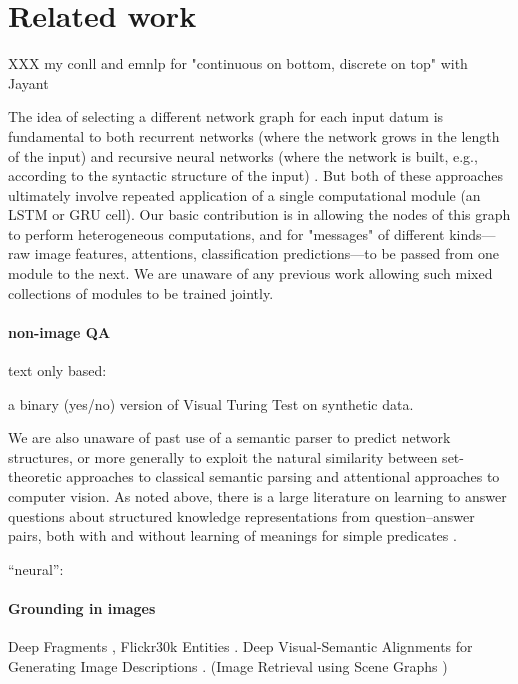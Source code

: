 \section{Related work}

XXX my conll and emnlp for "continuous on bottom, discrete on top" with Jayant

The idea of selecting a different network graph for each input datum is fundamental to both recurrent networks (where the network grows in the length of the input) \cite{Elman90RNN} and recursive neural networks (where the network is built, e.g., according to the syntactic structure of the input) \cite{Socher13CVG}. But both of these approaches ultimately involve repeated application of a single computational module (\eg an LSTM \cite{} or GRU \cite{} cell). Our basic contribution is in allowing the nodes of this graph to perform heterogeneous computations, and for "messages" of different kinds---raw image features, attentions, classification predictions---to be passed from one module to the next. We are unaware of any previous work allowing such mixed collections of modules to be trained jointly. 

\paragraph{non-image QA}
text only based: \cite{berant14acl,Liang13DCS}

\cite{geman15nas} a binary (yes/no) version of Visual Turing Test on synthetic data.

We are also unaware of past use of a semantic parser to predict network structures, or more generally to exploit the natural similarity between set-theoretic approaches to classical semantic parsing and attentional approaches to computer vision. As noted above, there is a large literature on learning to answer questions about structured knowledge representations from question--answer pairs, both with and without learning of meanings for simple predicates \cite{Liang13DCS,Krish2013Grounded}.

``neural'': \cite{iyyer14emnlp,weston14arxiv}

\paragraph{Grounding in images}
Deep Fragments \cite{karpathy14nips}, Flickr30k Entities \cite{plummer15iccv}.
Deep Visual-Semantic Alignments for Generating Image Descriptions \cite{karpathy15cvpr}.
(Image Retrieval using Scene Graphs \cite{johnson15cvpr})

